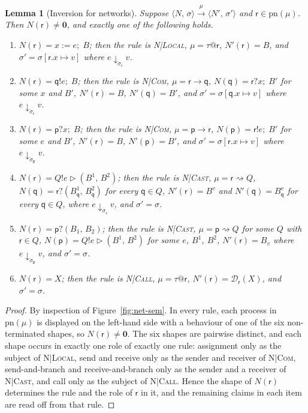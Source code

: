 \documentclass[11pt]{article}
\makeatletter
\theoremstyle{plain}
\newtheorem{lemma}[theorem]{Lemma}
\theoremstyle{definition}
\theoremstyle{remark}
\newcommand{\nil}{\mathbf{0}}
\newcommand{\seq}{;\;}
\newcommand{\pp}{\mathsf{p}}
\newcommand{\qq}{\mathsf{q}}
\newcommand{\rr}{\mathsf{r}}
\newcommand{\pn}{\mathrm{pn}}
\newcommand{\eval}[3]{#1 \downarrow_{#2} #3}
\newcommand{\conf}[2]{\langle #1,\, #2\rangle}
\newcommand{\lto}[1]{\xrightarrow{\;#1\;}}
\newcommand{\tauat}[1]{\tau\mathord{@}#1}
\newcommand{\cast}[2]{#1 \rightsquigarrow #2}
\newcommand{\upd}[3]{#1[#2 \mapsto #3]}
\newcommand{\rn}[1]{{\normalfont\scshape #1}}
\newcommand{\sendbr}[4]{#1!#2 \mathbin{\triangleright} (#3,\, #4)}
\newcommand{\recvbr}[3]{#1?(#2,\, #3)}
\newcommand{\NDefs}{\mathcal{D}}
\newcommand{\ldef}[2]{\NDefs_{#1}(#2)}
\makeatother
\begin{document}
\begin{lemma}[Inversion for networks]\label{lem:inversion}
  Suppose $\conf{N}{\sigma}\lto{\mu}\conf{N'}{\sigma'}$ and $\rr\in\pn(\mu)$.
  Then $N(\rr)\neq\nil$, and exactly one of the following holds.
  \begin{enumerate}[label=(\alph*),nosep]
  \item\label{it:inv-local} $N(\rr) = x := e\seq B$; then the rule is \rn{N|Local}, $\mu = \tauat\rr$, $N'(\rr) = B$, and $\sigma' = \upd{\sigma}{\rr.x}{v}$ where $\eval{e}{\sigma_\rr}{v}$.
  \item\label{it:inv-send} $N(\rr) = \qq!e\seq B$; then the rule is \rn{N|Com}, $\mu = \rr\to\qq$, $N(\qq) = \rr?x\seq B'$ for some $x$ and $B'$, $N'(\rr) = B$, $N'(\qq) = B'$, and $\sigma' = \upd{\sigma}{\qq.x}{v}$ where $\eval{e}{\sigma_\rr}{v}$.
  \item\label{it:inv-recv} $N(\rr) = \pp?x\seq B$; then the rule is \rn{N|Com}, $\mu = \pp\to\rr$, $N(\pp) = \rr!e\seq B'$ for some $e$ and $B'$, $N'(\rr) = B$, $N'(\pp) = B'$, and $\sigma' = \upd{\sigma}{\rr.x}{v}$ where $\eval{e}{\sigma_\pp}{v}$.
  \item\label{it:inv-cast} $N(\rr) = \sendbr{Q}{e}{B^1}{B^2}$; then the rule is \rn{N|Cast}, $\mu = \cast{\rr}{Q}$, $N(\qq) = \recvbr{\rr}{B_\qq^1}{B_\qq^2}$ for every $\qq\in Q$, $N'(\rr) = B^v$ and $N'(\qq) = B_\qq^v$ for every $\qq\in Q$, where $\eval{e}{\sigma_\rr}{v}$, and $\sigma' = \sigma$.
  \item\label{it:inv-brecv} $N(\rr) = \recvbr{\pp}{B_1}{B_2}$; then the rule is \rn{N|Cast}, $\mu = \cast{\pp}{Q}$ for some $Q$ with $\rr\in Q$, $N(\pp) = \sendbr{Q}{e}{B^1}{B^2}$ for some $e$, $B^1$, $B^2$, $N'(\rr) = B_v$ where $\eval{e}{\sigma_\pp}{v}$, and $\sigma' = \sigma$.
  \item\label{it:inv-call} $N(\rr) = X$; then the rule is \rn{N|Call}, $\mu = \tauat\rr$, $N'(\rr) = \ldef{\rr}{X}$, and $\sigma' = \sigma$.
  \end{enumerate}
\end{lemma}
\begin{proof}
  By inspection of Figure~\ref{fig:net-sem}.  In every rule, each process in
  $\pn(\mu)$ is displayed on the left-hand side with a behaviour of one of the
  six non-terminated shapes, so $N(\rr)\neq\nil$.  The six shapes are
  pairwise distinct, and each shape occurs in exactly one role of exactly one
  rule: assignment only as the subject of \rn{N|Local}, send and receive only
  as the sender and receiver of \rn{N|Com}, send-and-branch and
  receive-and-branch only as the sender and a receiver of \rn{N|Cast}, and
  call only as the subject of \rn{N|Call}.  Hence the shape of $N(\rr)$
  determines the rule and the role of $\rr$ in it, and the remaining claims
  in each item are read off from that rule.
\end{proof}
\end{document}
